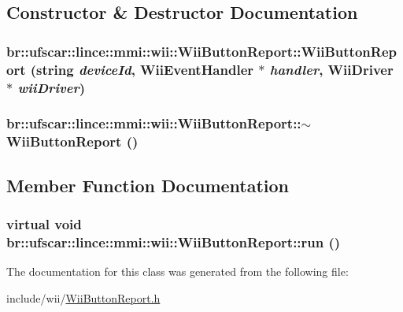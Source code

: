 \subsection{Constructor \& Destructor Documentation}
\hypertarget{classbr_1_1ufscar_1_1lince_1_1mmi_1_1wii_1_1WiiButtonReport_a7e958fef164118ccacbe8cd4eb7d3708}{
\subsubsection[{WiiButtonReport}]{\setlength{\rightskip}{0pt plus 5cm}br::ufscar::lince::mmi::wii::WiiButtonReport::WiiButtonReport (string {\em deviceId}, \/  {\bf WiiEventHandler} $\ast$ {\em handler}, \/  {\bf WiiDriver} $\ast$ {\em wiiDriver})}}
\label{classbr_1_1ufscar_1_1lince_1_1mmi_1_1wii_1_1WiiButtonReport_a7e958fef164118ccacbe8cd4eb7d3708}
\hypertarget{classbr_1_1ufscar_1_1lince_1_1mmi_1_1wii_1_1WiiButtonReport_a381456e6d72e3bf8503af0be300c7087}{
\subsubsection[{$\sim$WiiButtonReport}]{\setlength{\rightskip}{0pt plus 5cm}br::ufscar::lince::mmi::wii::WiiButtonReport::$\sim$WiiButtonReport ()}}
\label{classbr_1_1ufscar_1_1lince_1_1mmi_1_1wii_1_1WiiButtonReport_a381456e6d72e3bf8503af0be300c7087}


\subsection{Member Function Documentation}
\hypertarget{classbr_1_1ufscar_1_1lince_1_1mmi_1_1wii_1_1WiiButtonReport_a18c5cdabeb267b938b289249cb134016}{
\subsubsection[{run}]{\setlength{\rightskip}{0pt plus 5cm}virtual void br::ufscar::lince::mmi::wii::WiiButtonReport::run ()}}
\label{classbr_1_1ufscar_1_1lince_1_1mmi_1_1wii_1_1WiiButtonReport_a18c5cdabeb267b938b289249cb134016}


The documentation for this class was generated from the following file:\begin{DoxyCompactItemize}
\item 
include/wii/\hyperlink{WiiButtonReport_8h}{WiiButtonReport.h}\end{DoxyCompactItemize}

